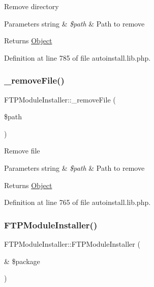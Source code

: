 Remove directory 
\begin{DoxyParams}[1]{Parameters}
string & {\em \$path} & Path to remove \\
\hline
\end{DoxyParams}
\begin{DoxyReturn}{Returns}
\hyperlink{classObject}{Object} 
\end{DoxyReturn}


Definition at line 785 of file autoinstall.\+lib.\+php.

\hypertarget{classFTPModuleInstaller_a97578f8c7903aded9a0141b1d378713b}{}\label{classFTPModuleInstaller_a97578f8c7903aded9a0141b1d378713b} 
\subsubsection{\texorpdfstring{\+\_\+remove\+File()}{\_removeFile()}}
{\footnotesize\ttfamily F\+T\+P\+Module\+Installer\+::\+\_\+remove\+File (\begin{DoxyParamCaption}\item[{}]{\$path }\end{DoxyParamCaption})}

Remove file


\begin{DoxyParams}[1]{Parameters}
string & {\em \$path} & Path to remove \\
\hline
\end{DoxyParams}
\begin{DoxyReturn}{Returns}
\hyperlink{classObject}{Object} 
\end{DoxyReturn}


Definition at line 765 of file autoinstall.\+lib.\+php.

\hypertarget{classFTPModuleInstaller_a77174bd1ad449c30c7f74333921441d6}{}\label{classFTPModuleInstaller_a77174bd1ad449c30c7f74333921441d6} 
\subsubsection{\texorpdfstring{F\+T\+P\+Module\+Installer()}{FTPModuleInstaller()}}
{\footnotesize\ttfamily F\+T\+P\+Module\+Installer\+::\+F\+T\+P\+Module\+Installer (\begin{DoxyParamCaption}\item[{\&}]{\$package }\end{DoxyParamCaption})}

